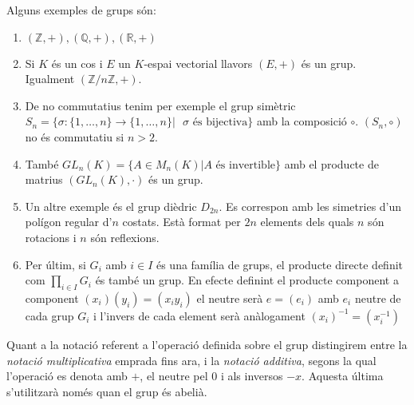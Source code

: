\documentclass[a4paper,11pt]{report}
\theoremstyle{theorem}
\theoremstyle{definition}
\begin{document}
Alguns exemples de grups són:
\begin{enumerate}
	\item $(\mathbb{Z,+}),(\mathbb{Q,+}), (\mathbb{R,+}) $
	\item Si $K$ és un cos i $E$ un $K$-espai vectorial llavors $(E,+)$ és un grup. Igualment $(\mathbb{Z}/n\mathbb{Z},+)$.
	\item De no commutatius tenim per exemple el grup simètric $S_n=\{\sigma:\{1,\ldots,n\}\rightarrow\{1,\ldots,n\}|\text{ } \sigma \text{ és bijectiva}\}$ amb la composició $\circ$. $(S_n,\circ)$ no és commutatiu si $n>2$.
	\item També $GL_n(K)=\{A\in M_n(K)| A \text{ és invertible}\}$ amb el producte de matrius $(GL_n(K),\cdot)$ és un grup.
	\item Un altre exemple és el grup dièdric $D_{2n}$. Es correspon amb les simetries d'un polígon regular d'$n$ costats. Està format per $2n$ elements dels quals $n$ són rotacions i $n$ són reflexions.
	\item Per últim, si $G_i$ amb $i\in I$ és una família de grups, el producte directe definit com $\prod_{i\in I} G_i$ és també un grup. En efecte definint el producte component a component $(x_i)(y_i)=(x_i y_i)$ el neutre serà $e=(e_i)$ amb $e_i$ neutre de cada grup $G_i$ i l'invers de cada element serà anàlogament $(x_i)^{-1}=(x_i^{-1})$
\end{enumerate}
Quant a la notació referent a l'operació definida sobre el grup distingirem entre la \textit{notació multiplicativa} emprada fins ara, i la \textit{notació additiva}, segons la qual l'operació es denota amb $+$, el neutre pel $0$ i als inversos $-x$. Aquesta última s'utilitzarà només quan el grup és abelià.
\end{document}
